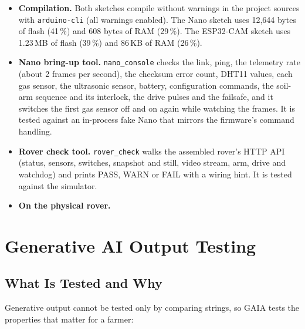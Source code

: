 \begin{itemize}
\item \textbf{Compilation.} Both sketches compile without warnings in the project sources with \texttt{arduino-cli} (all warnings enabled).
      The Nano sketch uses 12,644 bytes of flash (41\,\%) and 608 bytes of RAM (29\,\%). The ESP32-CAM sketch uses 1.23\,MB
      of flash (39\,\%) and 86\,KB of RAM (26\,\%).
\item \textbf{Nano bring-up tool.} \texttt{nano\_console} checks the link, ping, the telemetry rate (about 2 frames per second), the
      checksum error count, DHT11 values, each gas sensor, the ultrasonic sensor, battery, configuration commands, the soil-arm
      sequence and its interlock, the drive pulses and the failsafe, and it switches the first gas sensor off and on again
      while watching the frames. It is tested against an in-process fake Nano that mirrors the firmware's command handling.
\item \textbf{Rover check tool.} \texttt{rover\_check} walks the assembled rover's HTTP API (status, sensors, switches, snapshot and
      still, video stream, arm, drive and watchdog) and prints PASS, WARN or FAIL with a wiring hint. It is tested against the simulator.
\item \textbf{On the physical rover.} 
\end{itemize}

\section{Generative AI Output Testing}

\subsection{What Is Tested and Why}

Generative output cannot be tested only by comparing strings, so GAIA tests the properties that matter for a farmer:

